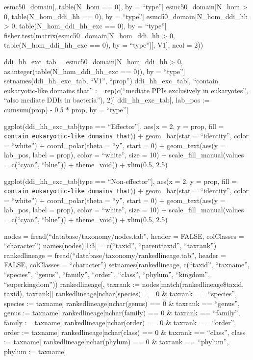 \documentclass[
]{article}
\begin{document}
esmc50\_domain{[}, table(N\_hom == 0), by = ``type''{]}
esmc50\_domain{[}N\_hom \textgreater{} 0, table(N\_hom\_ddi\_hh == 0),
by = ``type''{]} esmc50\_domain{[}N\_hom\_ddi\_hh \textgreater{} 0,
table(N\_hom\_ddi\_hh\_exc == 0), by = ``type''{]}
fisher.test(matrix(esmc50\_domain{[}N\_hom\_ddi\_hh \textgreater{} 0,
table(N\_hom\_ddi\_hh\_exc == 0), by = ``type''{]}{[}, V1{]}, ncol = 2))

ddi\_hh\_exc\_tab = esmc50\_domain{[}N\_hom\_ddi\_hh \textgreater{} 0,
as.integer(table(N\_hom\_ddi\_hh\_exc == 0)), by = ``type''{]}
setnames(ddi\_hh\_exc\_tab, ``V1'', ``prop'') ddi\_hh\_exc\_tab{[},
``contain eukaryotic-like domains that'' := rep(c(``mediate PPIs
exclusively in eukaryotes'', ``also mediate DDIs in bacteria''), 2){]}
ddi\_hh\_exc\_tab{[}, lab\_pos := cumsum(prop) - 0.5 * prop, by =
``type''{]}

ggplot(ddi\_hh\_exc\_tab{[}type == ``Effector''{]}, aes(x = 2, y = prop,
fill = \texttt{contain\ eukaryotic-like\ domains\ that})) +
geom\_bar(stat = ``identity'', color = ``white'') + coord\_polar(theta =
``y'', start = 0) + geom\_text(aes(y = lab\_pos, label = prop), color =
``white'', size = 10) + scale\_fill\_manual(values = c(``cyan'',
``blue'')) + theme\_void() + xlim(0.5, 2.5)

ggplot(ddi\_hh\_exc\_tab{[}type == ``Non-effector''{]}, aes(x = 2, y =
prop, fill = \texttt{contain\ eukaryotic-like\ domains\ that})) +
geom\_bar(stat = ``identity'', color = ``white'') + coord\_polar(theta =
``y'', start = 0) + geom\_text(aes(y = lab\_pos, label = prop), color =
``white'', size = 10) + scale\_fill\_manual(values = c(``cyan'',
``blue'')) + theme\_void() + xlim(0.5, 2.5)

nodes = fread(``database/taxonomy/nodes.tab'', header = FALSE,
colClasses = ``character'') names(nodes){[}1:3{]} = c(``taxid'',
``parenttaxid'', ``taxrank'') rankedlineage =
fread(``database/taxonomy/rankedlineage.tab'', header = FALSE,
colClasses = ``character'') setnames(rankedlineage, c(``taxid'',
``taxname'', ``species'', ``genus'', ``family'', ``order'', ``class'',
``phylum'', ``kingdom'', ``superkingdom'')) rankedlineage{[}, taxrank :=
nodes{[}match(rankedlineage\$taxid, taxid), taxrank{]}{]}
rankedlineage{[}nchar(species) == 0 \& taxrank == ``species'', species
:= taxname{]} rankedlineage{[}nchar(genus) == 0 \& taxrank == ``genus'',
genus := taxname{]} rankedlineage{[}nchar(family) == 0 \& taxrank ==
``family'', family := taxname{]} rankedlineage{[}nchar(order) == 0 \&
taxrank == ``order'', order := taxname{]} rankedlineage{[}nchar(class)
== 0 \& taxrank == ``class'', class := taxname{]}
rankedlineage{[}nchar(phylum) == 0 \& taxrank == ``phylum'', phylum :=
taxname{]}
\end{document}
